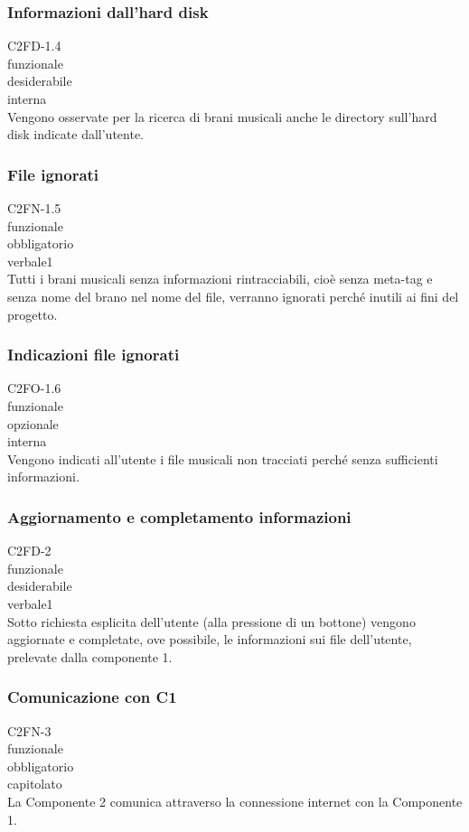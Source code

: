 \subsubsection*{Informazioni dall'hard disk}
 C2FD-1.4 \\
 funzionale \\
 desiderabile \\
 interna \\
Vengono osservate per la ricerca di brani musicali anche le directory sull'hard
disk indicate dall'utente.

\subsubsection*{File ignorati}
 C2FN-1.5 \\
 funzionale \\
 obbligatorio \\
 verbale1 \\
Tutti i brani musicali senza informazioni rintracciabili, cio\`e senza meta-tag e
senza nome del brano nel nome del file, verranno ignorati perch\'e inutili ai fini
del progetto.

\subsubsection*{Indicazioni file ignorati}
 C2FO-1.6 \\
 funzionale \\
 opzionale \\
 interna \\
Vengono indicati all'utente i file musicali non tracciati perch\'e senza
sufficienti informazioni.

\subsubsection*{Aggiornamento e completamento informazioni}
 C2FD-2 \\
 funzionale \\
 desiderabile \\
 verbale1 \\
Sotto richiesta esplicita dell'utente (alla pressione di un bottone) vengono
aggiornate e completate, ove possibile, le informazioni sui file dell'utente,
prelevate dalla componente 1.

\subsubsection*{Comunicazione con C1}
 C2FN-3 \\
 funzionale \\
 obbligatorio \\
 capitolato \\
La Componente 2 comunica attraverso la connessione internet con la Componente 1.


